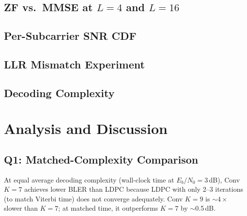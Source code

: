 \documentclass[12pt, a4paper]{article}
\begin{document}
\subsection{ZF vs.\ MMSE at $L=4$ and $L=16$}

\subsection{Per-Subcarrier SNR CDF}

\subsection{LLR Mismatch Experiment}

\subsection{Decoding Complexity}

\section{Analysis and Discussion}

\subsection{Q1: Matched-Complexity Comparison}
At equal average decoding complexity (wall-clock time at $E_b/N_0=3$\,dB), Conv $K=7$ achieves lower BLER than LDPC because LDPC with only 2--3 iterations (to match Viterbi time) does not converge adequately. Conv $K=9$ is $\sim4\times$ slower than $K=7$; at matched time, it outperforms $K=7$ by $\sim$0.5\,dB.
\end{document}
